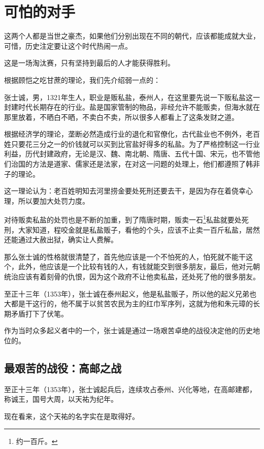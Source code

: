\section{可怕的对手}
\ifnum{}
	\begin{multicols}{\theparacolNo}
		\fi
		这两个人都是当世之豪杰，如果他们分别出现在不同的朝代，应该都能成就大业，可惜，历史注定要让这个时代热闹一点。

		这是一场淘汰赛，只有坚持到最后的人才能获得胜利。

		根据顾恺之吃甘蔗的理论，我们先介绍弱一点的：

		张士诚，男，1321年生人，职业是贩私盐，泰州人，在这里要先说一下贩私盐这一封建时代长期存在的行业。盐是国家管制的物品，非经允许不能贩卖，但海水就在那里放着，不晒白不晒，不卖白不卖，所以很多人都看上了这条发财之道。

		根据经济学的理论，垄断必然造成行业的退化和官僚化，古代盐业也不例外，老百姓只要花三分之一的价钱就可以买到比官盐好得多的私盐。为了严格控制这一行业利益，历代封建政府，无论是汉、魏、南北朝、隋唐、五代十国、宋元，也不管他们治国的方法是道家、儒家还是法家，在对这一问题的处理上，他们都遵照了韩非子的理论。

		这一理论认为：老百姓明知去河里捞金要处死刑还要去干，是因为存在着侥幸心理，所以要加大处罚力度。

		对待贩卖私盐的处罚也是不断的加重，到了隋唐时期，贩卖一石\footnote{约一百斤。}私盐就要处死刑，大家知道，程咬金就是私盐贩子，看他的个头，应该不止卖一百斤私盐，居然还能通过大赦出狱，确实让人费解。

		那么张士诚的性格就很清楚了，首先他应该是一个不怕死的人，怕死就不能干这个，此外，他应该是一个比较有钱的人，有钱就能交到很多朋友，最后，他对元朝统治应该有着刻骨的仇恨，因为这个政府不让他卖私盐，还处死了他的很多朋友。

		至正十三年（1353年），张士诚在泰州起义，他是私盐贩子，所以他的起义兄弟也大都是干这行的，他不属于以贫苦农民为主的红巾军序列，这就为他和朱元璋的长期矛盾打下了伏笔。

		作为当时众多起义者中的一个，张士诚是通过一场艰苦卓绝的战役决定他的历史地位的。

		\subsection{最艰苦的战役：高邮之战}
		至正十三年（1353年），张士诚起兵后，连续攻占泰州、兴化等地，在高邮建都，称诚王，国号大周，以天祐为纪年。

		现在看来，这个天祐的名字实在是取得好。


\end{multicols}
